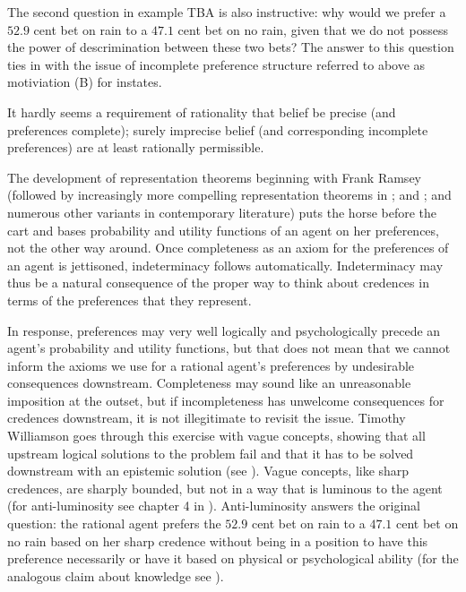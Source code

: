 \documentclass[11pt]{article}
\begin{document}
The second question in example TBA\tbd{} is also instructive: why
would we prefer a $52.9$ cent bet on rain to a $47.1$ cent bet on no
rain, given that we do not possess the power of descrimination between
these two bets? The answer to this question ties in with the issue of
incomplete preference structure referred to above as motiviation (B)
for instates.

\begin{quotex}
  It hardly seems a requirement of rationality that belief be precise
  (and preferences complete); surely imprecise belief (and
  corresponding incomplete preferences) are at least rationally
  permissible. 
\end{quotex}

The development of representation theorems beginning with Frank Ramsey
(followed by increasingly more compelling representation theorems in
; and ; and numerous other
variants in contemporary literature) puts the horse before the cart
and bases probability and utility functions of an agent on her
preferences, not the other way around. Once completeness as an axiom
for the preferences of an agent is jettisoned, indeterminacy follows
automatically. Indeterminacy may thus be a natural consequence of the
proper way to think about credences in terms of the preferences that
they represent.

In response, preferences may very well logically and psychologically
precede an agent's probability and utility functions, but that does
not mean that we cannot inform the axioms we use for a rational
agent's preferences by undesirable consequences downstream.
Completeness may sound like an unreasonable imposition at the outset,
but if incompleteness has unwelcome consequences for credences
downstream, it is not illegitimate to revisit the issue. Timothy
Williamson goes through this exercise with vague concepts, showing
that all upstream logical solutions to the problem fail and that it
has to be solved downstream with an epistemic solution (see
). Vague concepts, like sharp credences, are
sharply bounded, but not in a way that is luminous to the agent (for
anti-luminosity see chapter 4 in ).
Anti-luminosity answers the original question: the rational agent
prefers the $52.9$ cent bet on rain to a $47.1$ cent bet on no rain
based on her sharp credence without being in a position to have this
preference necessarily or have it based on physical or psychological
ability (for the analogous claim about knowledge see
).
\end{document}
